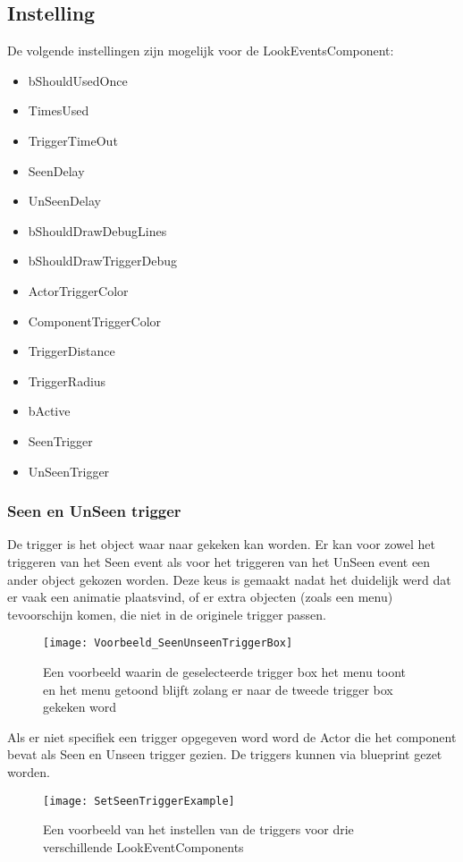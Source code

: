 \subsection{Instelling}
De volgende instellingen zijn mogelijk voor de LookEventsComponent:

\begin{itemize}
	\item bShouldUsedOnce
	\item TimesUsed
	\item TriggerTimeOut
	\item SeenDelay
	\item UnSeenDelay
	\item bShouldDrawDebugLines
	\item bShouldDrawTriggerDebug
	\item ActorTriggerColor
	\item ComponentTriggerColor
	\item TriggerDistance
	\item TriggerRadius
	\item bActive
	\item SeenTrigger
	\item UnSeenTrigger
\end{itemize}

\subsubsection{Seen en UnSeen trigger}
De trigger is het object waar naar gekeken kan worden. Er kan voor zowel het triggeren van het Seen event als voor het triggeren van het UnSeen event een ander object gekozen worden. Deze keus is gemaakt nadat het duidelijk werd dat er vaak een animatie plaatsvind, of er extra objecten (zoals een menu) tevoorschijn komen, die niet in de originele trigger passen.

\begin{figure}[!ht]
  \centering
    \texttt{[image: Voorbeeld\_SeenUnseenTriggerBox]}
    \caption{Een voorbeeld waarin de geselecteerde trigger box het menu toont en het menu getoond blijft zolang er naar de tweede trigger box gekeken word}
\end{figure}

Als er niet specifiek een trigger opgegeven word word de Actor die het component bevat als Seen en Unseen trigger gezien. De triggers kunnen via blueprint gezet worden.

\begin{figure}[!ht]
  \centering
    \texttt{[image: SetSeenTriggerExample]}
    \caption{Een voorbeeld van het instellen van de triggers voor drie verschillende LookEventComponents}
\end{figure}

